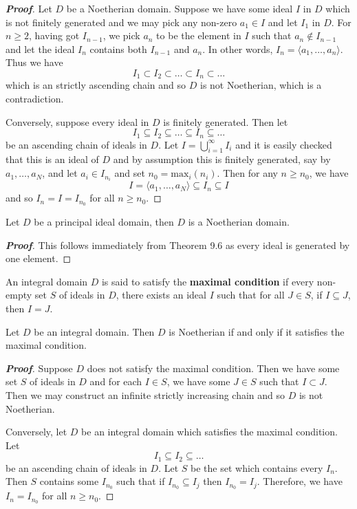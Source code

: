 \begin{proof}[\bf Proof] Let $D$ be a Noetherian domain. Suppose we have some ideal $I$ in $D$ which is not finitely generated and we may pick any non-zero $a_1 \in I$ and let $I_1$ in $D$. For $n \ge 2$, having got $I_{n-1}$, we pick $a_n$ to be the element in $I$ such that $a_n \not \in I_{n-1}$ and let
the ideal $I_n$ contains both $I_{n-1}$ and $a_n$. In other words, $I_n=\langle a_1,\ldots,a_n \rangle$.
Thus we have
$$I_1 \subset I_2 \subset \ldots \subset I_n \subset \ldots$$
which is an strictly ascending chain and so $D$ is not Noetherian, which is a contradiction.

Conversely, suppose every ideal in $D$ is finitely generated. Then let
$$I_1 \subseteq I_2 \subseteq \ldots \subseteq I_n \subseteq \ldots$$
be an ascending chain of ideals in $D$. Let $I=\bigcup_{i=1}^\infty I_i$ and it is easily checked that this is an ideal of $D$ and by assumption this is finitely generated, say by $a_1,\ldots,a_N$, and let
$a_i \in I_{n_i}$ and set $n_0= \text{max}_i(n_i)$. Then for any $n \ge n_0$, we have
$$I=\langle a_1,\ldots,a_N \rangle \subseteq I_n \subseteq I$$ and so $I_n=I=I_{n_0}$ for all $n \ge n_0$.
\end{proof}
\begin{theorem} Let $D$ be a principal ideal domain, then $D$ is a Noetherian domain.
\end{theorem}
\begin{proof}[\bf Proof] This follows immediately from Theorem 9.6 as every ideal is generated by one element.
\end{proof}
\begin{definition} An integral domain $D$ is said to satisfy the {\bf maximal condition} if every non-empty set $S$ of ideals in $D$, there exists an ideal $I$ such that for all $J \in S$, if $I \subseteq J$, then $I=J$.
\end{definition}
\begin{theorem} Let $D$  be an integral domain. Then $D$ is Noetherian if and only if it satisfies the maximal condition.
\end{theorem}
\begin{proof}[\bf Proof] Suppose $D$ does not satisfy the maximal condition. Then we have some set $S$ of ideals in $D$ and for each $I \in S$, we have some $J \in S$ such that $I \subset J$. Then we may construct an infinite strictly increasing chain and so $D$ is not Noetherian.

Conversely, let $D$ be an integral domain which satisfies the maximal condition. Let
$$I_1 \subseteq I_2 \subseteq \ldots$$
be an ascending chain of ideals in $D$. Let $S$ be the set which contains every $I_n$.  Then $S$ contains some $I_{n_0}$ such that if $I_{n_0} \subseteq I_j$ then $I_{n_0}=I_j$. Therefore, we have
$I_n=I_{n_0}$ for all $n \ge n_0$.
\end{proof}
